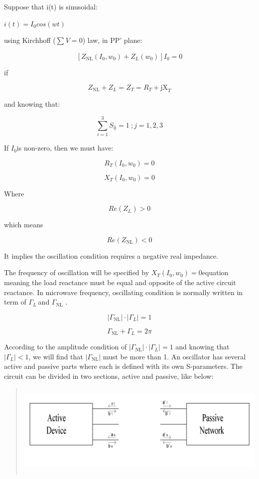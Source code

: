 Suppose that i(t) is sinusoidal:

\(i(t) = I_{0}cos(wt)\)

using Kirchhoff (\(\sum_{}^{}V = 0\)) law, in PP' plane:

\[\left\lbrack Z_{\text{NL}}(I_{0},w_{0}) + Z_{L}(w_{0}) \right\rbrack I_{0} = 0\]

if

\[Z_{\text{NL}} + Z_{L} = Z_{T} = R_{T} + \text{jX}_{T}\]

and knowing that:

\[\sum_{i = 1}^{3}S_{\text{ij}} = 1\ ;j = 1,2,3\]

If \(I_{0}\)is non-zero, then we must have:

\[R_{T}(I_{0},w_{0}) = 0\]

\[X_{T}(I_{0},w_{0}) = 0\]

Where

\[Re(Z_{L}) > 0\]

which means

\[Re(Z_{\text{NL}}) < 0\]

It implies the oscillation condition requires a negative real impedance.

The frequency of oscillation will be specified by
\(X_{T}(I_{0},w_{0}) = 0\)equation meaning the load reactance must be
equal and opposite of the active circuit reactance. In microwave
frequency, oscillating condition is normally written in term of
\(\Gamma_{L}\ \)and \(\Gamma_{\text{NL}}\) .

\[\left| \Gamma_{\text{NL}} \right| \cdot \left| \Gamma_{L} \right| = 1\]

\[\Gamma_{\text{NL}} + \Gamma_{L} = 2\pi\]

According to the amplitude condition of
\(\left| \Gamma_{\text{NL}} \right| \cdot \left| \Gamma_{L} \right| = 1\)
and knowing that \(\left| \Gamma_{L} \right| < 1\), we will find that
\(\left| \Gamma_{\text{NL}} \right|\) must be more than 1. An oscillator
has several active and passive parts where each is defined with its own
S-parameters. The circuit can be divided in two sections, active and
passive, like below:

\begin{quote}
\includegraphics[width=5.52778in,height=1.76389in]{media/image10.png}
\end{quote}

